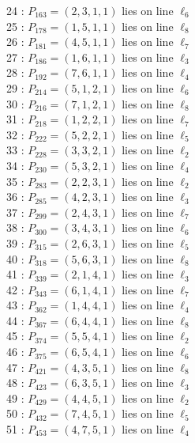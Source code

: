 \documentclass{article}
\begin{document}
{\begin{multicols}{2}
24 : $P_{163}=( 2, 3, 1, 1 )$ lies on line $\ell_{6}$\\
25 : $P_{178}=( 1, 5, 1, 1 )$ lies on line $\ell_{8}$\\
26 : $P_{181}=( 4, 5, 1, 1 )$ lies on line $\ell_{7}$\\
27 : $P_{186}=( 1, 6, 1, 1 )$ lies on line $\ell_{3}$\\
28 : $P_{192}=( 7, 6, 1, 1 )$ lies on line $\ell_{4}$\\
29 : $P_{214}=( 5, 1, 2, 1 )$ lies on line $\ell_{6}$\\
30 : $P_{216}=( 7, 1, 2, 1 )$ lies on line $\ell_{8}$\\
31 : $P_{218}=( 1, 2, 2, 1 )$ lies on line $\ell_{7}$\\
32 : $P_{222}=( 5, 2, 2, 1 )$ lies on line $\ell_{5}$\\
33 : $P_{228}=( 3, 3, 2, 1 )$ lies on line $\ell_{2}$\\
34 : $P_{230}=( 5, 3, 2, 1 )$ lies on line $\ell_{4}$\\
35 : $P_{283}=( 2, 2, 3, 1 )$ lies on line $\ell_{2}$\\
36 : $P_{285}=( 4, 2, 3, 1 )$ lies on line $\ell_{3}$\\
37 : $P_{299}=( 2, 4, 3, 1 )$ lies on line $\ell_{7}$\\
38 : $P_{300}=( 3, 4, 3, 1 )$ lies on line $\ell_{6}$\\
39 : $P_{315}=( 2, 6, 3, 1 )$ lies on line $\ell_{5}$\\
40 : $P_{318}=( 5, 6, 3, 1 )$ lies on line $\ell_{8}$\\
41 : $P_{339}=( 2, 1, 4, 1 )$ lies on line $\ell_{3}$\\
42 : $P_{343}=( 6, 1, 4, 1 )$ lies on line $\ell_{7}$\\
43 : $P_{362}=( 1, 4, 4, 1 )$ lies on line $\ell_{4}$\\
44 : $P_{367}=( 6, 4, 4, 1 )$ lies on line $\ell_{8}$\\
45 : $P_{374}=( 5, 5, 4, 1 )$ lies on line $\ell_{2}$\\
46 : $P_{375}=( 6, 5, 4, 1 )$ lies on line $\ell_{6}$\\
47 : $P_{421}=( 4, 3, 5, 1 )$ lies on line $\ell_{8}$\\
48 : $P_{423}=( 6, 3, 5, 1 )$ lies on line $\ell_{3}$\\
49 : $P_{429}=( 4, 4, 5, 1 )$ lies on line $\ell_{2}$\\
50 : $P_{432}=( 7, 4, 5, 1 )$ lies on line $\ell_{5}$\\
51 : $P_{453}=( 4, 7, 5, 1 )$ lies on line $\ell_{4}$\\

\end{multicols}}
\end{document}
